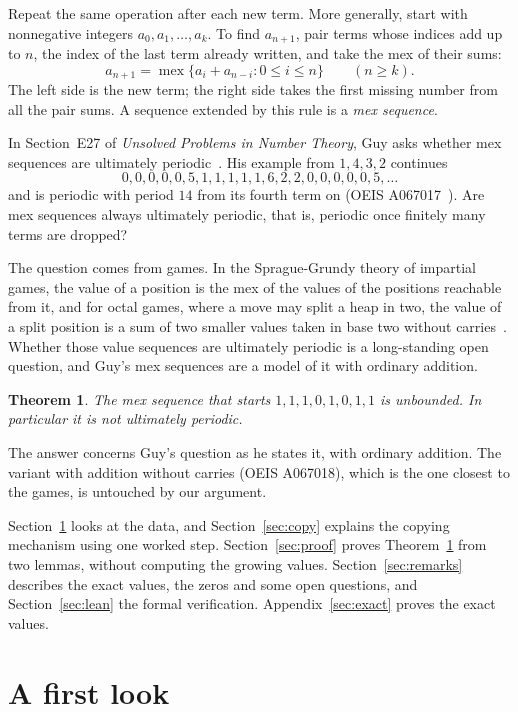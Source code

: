 \documentclass[11pt]{amsart}
\newtheorem{theorem}{Theorem}
\theoremstyle{remark}
\DeclareMathOperator{\mex}{mex}
\begin{document}
Repeat the same operation after each new term. More generally, start with nonnegative integers $a_0,a_1,\dots,a_k$. To find $a_{n+1}$, pair terms whose indices add up to $n$, the index of the last term already written, and take the mex of their sums:
\begin{equation}\label{eq:rule}
 a_{n+1}=\mex\{a_i+a_{n-i}:0\le i\le n\}\qquad(n\ge k).
\end{equation}
The left side is the new term; the right side takes the first missing number from all the pair sums. A sequence extended by this rule is a \emph{mex sequence}.

In Section~E27 of \emph{Unsolved Problems in Number Theory}, Guy asks whether mex sequences are ultimately periodic~\cite{Guy}. His example from $1,4,3,2$ continues
\[
 0,0,0,0,0,5,1,1,1,1,1,6,2,2,0,0,0,0,0,5,\dots
\]
and is periodic with period $14$ from its fourth term on (OEIS A067017~\cite{OEIS}). Are mex sequences always ultimately periodic, that is, periodic once finitely many terms are dropped?

The question comes from games. In the Sprague-Grundy theory of impartial games, the value of a position is the mex of the values of the positions reachable from it, and for octal games, where a move may split a heap in two, the value of a split position is a sum of two smaller values taken in base two without carries~\cite{WW}. Whether those value sequences are ultimately periodic is a long-standing open question, and Guy's mex sequences are a model of it with ordinary addition.

\begin{theorem}\label{thm:main}
The mex sequence that starts $1,1,1,0,1,0,1,1$ is unbounded. In particular it is not ultimately periodic.
\end{theorem}

The answer concerns Guy's question as he states it, with ordinary addition. The variant with addition without carries (OEIS A067018), which is the one closest to the games, is untouched by our argument.

Section~\ref{sec:look} looks at the data, and Section~\ref{sec:copy} explains the copying mechanism using one worked step. Section~\ref{sec:proof} proves Theorem~\ref{thm:main} from two lemmas, without computing the growing values. Section~\ref{sec:remarks} describes the exact values, the zeros and some open questions, and Section~\ref{sec:lean} the formal verification. Appendix~\ref{sec:exact} proves the exact values.

\section{A first look}\label{sec:look}
\end{document}
